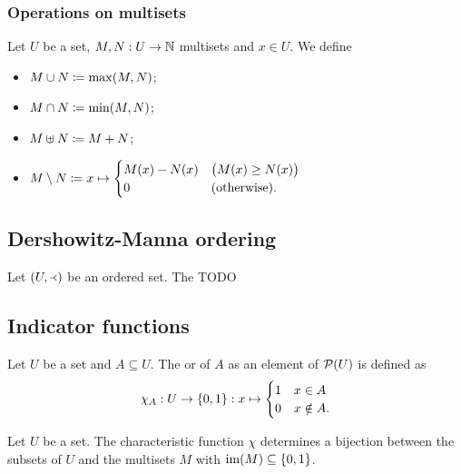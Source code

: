 \subsubsection{Operations on multisets}
\begin{definition}
Let $U$ be a set, $M,N: U\to \mathbb{N}$ multisets and $x\in U$. We define
\begin{itemize}
\item $M\cup N \coloneqq \max(M,N)$;
\item $M\cap N \coloneqq \min(M,N)$;
\item $M\uplus N \coloneqq M+N$;
\item $M\setminus N \coloneqq x\mapsto\begin{cases}
M(x) - N(x) & \big(M(x) \geq N(x)\big) \\
0 & (\text{otherwise}).
\end{cases}$
\end{itemize}
\end{definition}

\subsection{Dershowitz-Manna ordering}
\begin{definition}
Let $\sSet{U,\Yleft}$ be an ordered set. The TODO
\end{definition}

\subsection{Indicator functions}
\begin{definition}
Let $U$ be a set and $A\subseteq U$. The  or  of $A$ as an element of $\operatorname{\mathcal{P}}(U)$ is defined as
\[ \chi_{A}: U\to \{0,1\}: x\mapsto \begin{cases}
1 & x\in A \\ 0 & x\notin A.
\end{cases} \]
\end{definition}

\begin{lemma}
Let $U$ be a set. The characteristic function $\chi$ determines a bijection between the subsets of $U$ and the multisets $M$ with $\operatorname{im}(M)\subseteq \{0,1\}$.
\end{lemma}

